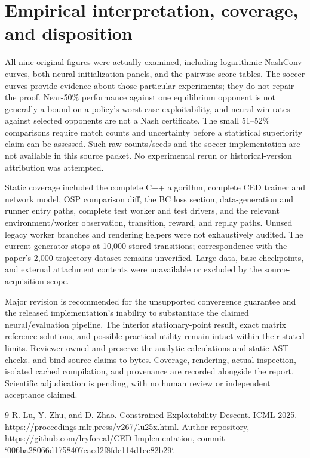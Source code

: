 \documentclass[10pt]{article}
\begin{document}
\section*{Empirical interpretation, coverage, and disposition}
All nine original figures were actually examined, including logarithmic NashConv curves, both neural initialization panels, and the pairwise score tables. The soccer curves provide evidence about those particular experiments; they do not repair the proof. Near-50\% performance against one equilibrium opponent is not generally a bound on a policy’s worst-case exploitability, and neural win rates against selected opponents are not a Nash certificate. The small 51–52\% comparisons require match counts and uncertainty before a statistical superiority claim can be assessed. Such raw counts/seeds and the soccer implementation are not available in this source packet. No experimental rerun or historical-version attribution was attempted.\par
Static coverage included the complete C++ algorithm, complete CED trainer and network model, OSP comparison diff, the BC loss section, data-generation and runner entry paths, complete test worker and test drivers, and the relevant environment/worker observation, transition, reward, and replay paths. Unused legacy worker branches and rendering helpers were not exhaustively audited. The current generator stops at 10,000 stored transitions; correspondence with the paper’s 2,000-trajectory dataset remains unverified. Large data, base checkpoints, and external attachment contents were unavailable or excluded by the source-acquisition scope.\par
Major revision is recommended for the unsupported convergence guarantee and the released implementation’s inability to substantiate the claimed neural/evaluation pipeline. The interior stationary-point result, exact matrix reference solutions, and possible practical utility remain intact within their stated limits. Reviewer-owned and preserve the analytic calculations and static AST checks. and bind source claims to bytes. Coverage, rendering, actual inspection, isolated cached compilation, and provenance are recorded alongside the report. Scientific adjudication is pending, with no human review or independent acceptance claimed.\par
9 R. Lu, Y. Zhu, and D. Zhao. Constrained Exploitability Descent. ICML 2025. https://proceedings.mlr.press/v267/lu25x.html. Author repository, https://github.com/lryforeal/CED-Implementation, commit `006ba28066d1758407caed2f8fde114d1ec82b29`.\par
\end{document}
